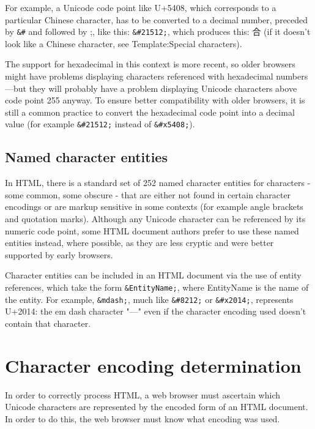 For example, a Unicode code point like U+5408, which corresponds to a particular Chinese character, has to be converted to a decimal number, preceded by \texttt{\&\#} and followed by ;, like this: \texttt{\&\#21512;}, which produces this: 合 (if it doesn't look like a Chinese character, see Template:Special characters).


The support for hexadecimal in this context is more recent, so older browsers might have problems displaying characters referenced with hexadecimal numbers—but they will probably have a problem displaying Unicode characters above code point 255 anyway. To ensure better compatibility with older browsers, it is still a common practice to convert the hexadecimal code point into a decimal value (for example \texttt{\&\#21512;} instead of \texttt{\&\#x5408;}).



\subsection{Named character entities}

In HTML, there is a standard set of 252 named character entities for characters - some common, some obscure - that are either not found in certain character encodings or are markup sensitive in some contexts (for example angle brackets and quotation marks). Although any Unicode character can be referenced by its numeric code point, some HTML document authors prefer to use these named entities instead, where possible, as they are less cryptic and were better supported by early browsers.

Character entities can be included in an HTML document via the use of entity references, which take the form \texttt{\&EntityName;}, where EntityName is the name of the entity. For example, \texttt{\&mdash;}, much like \texttt{\&\#8212;} or \texttt{\&\#x2014;}, represents U+2014: the em dash character "—" even if the character encoding used doesn't contain that character.





\section{Character encoding determination}


In order to correctly process HTML, a web browser must ascertain which Unicode characters are represented by the encoded form of an HTML document. In order to do this, the web browser must know what encoding was used.





